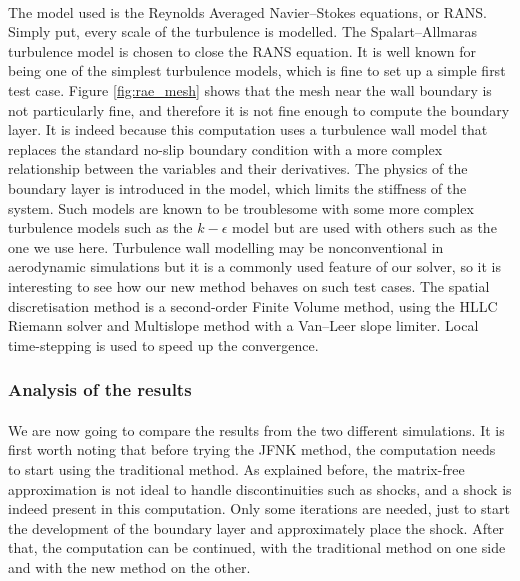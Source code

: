         \paragraph{}
        The model used is the Reynolds Averaged Navier--Stokes equations, or RANS.
        Simply put, every scale of the turbulence is modelled.
        The Spalart--Allmaras turbulence model is chosen to close the RANS equation.
        It is well known for being one of the simplest turbulence models, which is fine to set up a simple first test case.
        Figure \ref{fig:rae_mesh} shows that the mesh near the wall boundary is not particularly fine, and therefore it is not fine enough to compute the boundary layer.
        It is indeed because this computation uses a turbulence wall model that replaces the standard no-slip boundary condition with a more complex relationship between the variables and their derivatives.
        The physics of the boundary layer is introduced in the model, which limits the stiffness of the system.
        Such models are known to be troublesome with some more complex turbulence models such as the $k-\epsilon$ model but are used with others such as the one we use here.
        Turbulence wall modelling may be nonconventional in aerodynamic simulations but it is a commonly used feature of our solver, so it is interesting to see how our new method behaves on such test cases.
        The spatial discretisation method is a second-order Finite Volume method, using the HLLC Riemann solver and Multislope method \cite{LeTouzeMurroneGuillard2015} with a Van--Leer slope limiter.
        Local time-stepping is used to speed up the convergence.


      \subsubsection{Analysis of the results}

        \paragraph{}
        We are now going to compare the results from the two different simulations.
        It is first worth noting that before trying the JFNK method, the computation needs to start using the traditional method.
        As explained before, the matrix-free approximation is not ideal to handle discontinuities such as shocks, and a shock is indeed present in this computation.
        Only some iterations are needed, just to start the development of the boundary layer and approximately place the shock.
        After that, the computation can be continued, with the traditional method on one side and with the new method on the other.

